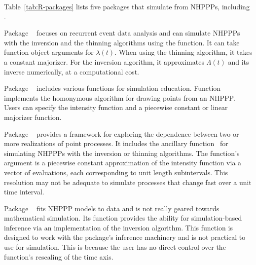 \documentclass[article,nojss]{jss}\usepackage[]{graphicx}\usepackage[]{xcolor}
\newcommand{\fct}[1]{\code{#1()}}
\begin{document}
Table~\ref{tab:R-packages} lists five  packages that simulate from NHPPPs, including .

Package ~\citep{reda-package} focuses on recurrent event data analysis and can simulate NHPPPs with the inversion and the thinning algorithms using the \fct{simEvent} function. It can take function object arguments for $\lambda(t)$. When using the thinning algorithm, it takes a constant majorizer. For the inversion algorithm, it approximates $\Lambda(t)$ and its inverse numerically, at a computational cost.

Package ~\citep{simEd-package} includes various functions for simulation education. Function \fct{thinning} implements the homonymous algorithm for drawing points from an NHPPP. Users can specify the intensity function and a piecewise constant or linear majorizer function.

Package ~\citep{IndTestPP-package} provides a framework for exploring the dependence between two or more realizations of point processes. It includes the ancillary function~\fct{simNHPc} for simulating NHPPPs with the inversion or thinning algorithms. The function's argument is a piecewise constant approximation of the intensity function via a vector of evaluations, each corresponding to unit length subintervals. This resolution may not be adequate to simulate processes that change fast over a unit time interval.

Package ~\citep{NHPoisson-jss, NHPoisson-package} fits NHPPP models to data and is not really geared towards mathematical simulation. Its \fct{simNHP.fun} function provides the ability for simulation-based inference via an implementation of the inversion algorithm. This function is designed to work with the package's inference machinery and is not practical to use for simulation. This is because the user has no direct control over the function's rescaling of the time axis.

\end{document}

